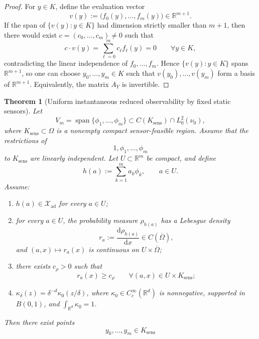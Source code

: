 \documentclass{article}
\newtheorem{theorem}{Theorem}[section]
\theoremstyle{definition}
\renewcommand{\d}{\mathrm{d}}
\begin{document}
\begin{proof}
    For \(y\in K\), define the evaluation vector
    \[
        v(y):=\bigl(f_0(y),\dots,f_m(y)\bigr)\in\mathbb R^{m+1}.
    \]
    If the span of \(\{v(y):y\in K\}\) had dimension strictly smaller than \(m+1\), then there would
    exist \(c=(c_0,\dots,c_m)\neq 0\) such that
    \[
        c\cdot v(y)=\sum_{\ell=0}^m c_\ell f_\ell(y)=0
        \qquad\forall y\in K,
    \]
    contradicting the linear independence of \(f_0,\dots,f_m\). Hence
    \(\{v(y):y\in K\}\) spans \(\mathbb R^{m+1}\), so one can choose
    \(y_0,\dots,y_m\in K\) such that \(v(y_0),\dots,v(y_m)\) form a basis of \(\mathbb R^{m+1}\).
    Equivalently, the matrix \(A_Y\) is invertible.
\end{proof}

\begin{theorem}[Uniform instantaneous reduced observability by fixed static sensors]
    \label{thm:static-reduced-full-observability}
    Let
    \[
        V_m=\operatorname{span}\{\phi_1,\dots,\phi_m\}\subset C(K_{\mathrm{sens}})\cap L^2_0(\nu_0),
    \]
    where \(K_{\mathrm{sens}}\subset\Omega\) is a nonempty compact sensor-feasible region. Assume that the
    restrictions of
    \[
        1,\phi_1,\dots,\phi_m
    \]
    to \(K_{\mathrm{sens}}\) are linearly independent. Let \(U\subset\mathbb R^m\) be compact, and define
    \[
        h(a):=\sum_{k=1}^m a_k\phi_k,
        \qquad a\in U.
    \]
    Assume:
    \begin{enumerate}
        \item \(h(a)\in\mathcal X_{\mathrm{ad}}\) for every \(a\in U\);
        \item for every \(a\in U\), the probability measure \(\rho_{h(a)}\) has a Lebesgue density
              \[
                  r_a:=\frac{\d\rho_{h(a)}}{\d x}\in C(\overline\Omega),
              \]
              and \((a,x)\mapsto r_a(x)\) is continuous on \(U\times\overline\Omega\);
        \item there exists \(c_\rho>0\) such that
              \[
                  r_a(x)\ge c_\rho
                  \qquad
                  \forall (a,x)\in U\times K_{\mathrm{sens}};
              \]
        \item \(\kappa_\delta(z)=\delta^{-d}\kappa_0(z/\delta)\), where
              \(\kappa_0\in C_c^\infty(\mathbb R^d)\) is nonnegative, supported in \(B(0,1)\), and
              \(\int_{\mathbb R^d}\kappa_0=1\).
    \end{enumerate}
    Then there exist points
    \[
        y_0,\dots,y_m\in K_{\mathrm{sens}}
\]
\end{theorem}
\end{document}
